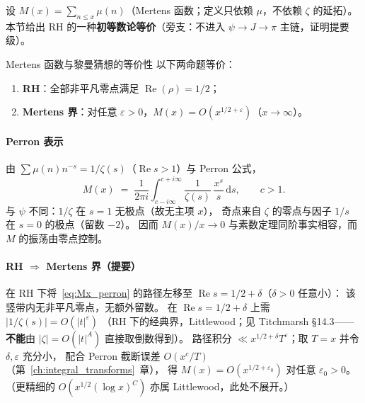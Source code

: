 设 $M(x)=\sum_{n\le x}\mu(n)$（Mertens 函数；定义只依赖 $\mu$，不依赖 $\zeta$ 的延拓）。
本节给出 RH 的一种\textbf{初等数论等价}（旁支：不进入 $\psi\to J\to\pi$ 主链，证明提要级）。

\begin{theorem}{Mertens 函数与黎曼猜想的等价性}{}
\label{thm:mertens_rh}
以下两命题等价：
\begin{enumerate}
  \item \textbf{RH}：全部非平凡零点满足 $\operatorname{Re}(\rho)=1/2$；
  \item \textbf{Mertens 界}：对任意 $\varepsilon>0$，$M(x)=O(x^{1/2+\varepsilon})$（$x\to\infty$）。
\end{enumerate}
\end{theorem}

\paragraph{Perron 表示}
由 $\sum\mu(n)n^{-s}=1/\zeta(s)$（$\operatorname{Re}s>1$）与 Perron 公式，
\begin{equation}
  M(x)
  \;=\;
  \frac{1}{2\pi i}\int_{c-i\infty}^{c+i\infty}
  \frac{1}{\zeta(s)}\,\frac{x^s}{s}\,\mathrm{d}s,
  \qquad c>1.
  \label{eq:Mx_perron}
\end{equation}
与 $\psi$ 不同：$1/\zeta$ 在 $s=1$ 无极点（故无主项 $x$），
奇点来自 $\zeta$ 的零点与因子 $1/s$ 在 $s=0$ 的极点（留数 $-2$）。
因而 $M(x)/x\to 0$ 与素数定理同阶事实相容，而 $M$ 的振荡由零点控制。

\paragraph{RH $\Rightarrow$ Mertens 界（提要）}
在 RH 下将~\eqref{eq:Mx_perron} 的路径左移至 $\operatorname{Re}s=1/2+\delta$（$\delta>0$ 任意小）：
该竖带内无非平凡零点，无额外留数。
在 $\operatorname{Re}s=1/2+\delta$ 上需 $|1/\zeta(s)|=O(|t|^{\varepsilon})$
（RH 下的经典界，Littlewood；见 Titchmarsh §14.3——\textbf{不能}由 $|\zeta|=O(|t|^A)$ 直接取倒数得到）。
路径积分 $\ll x^{1/2+\delta}T^{\varepsilon}$；取 $T=x$ 并令 $\delta,\varepsilon$ 充分小，
配合 Perron 截断误差 $O(x^{c}/T)$（第~\ref{ch:integral_transforms}~章），
得 $M(x)=O(x^{1/2+\varepsilon_0})$ 对任意 $\varepsilon_0>0$。
（更精细的 $O(x^{1/2}(\log x)^C)$ 亦属 Littlewood，此处不展开。）

